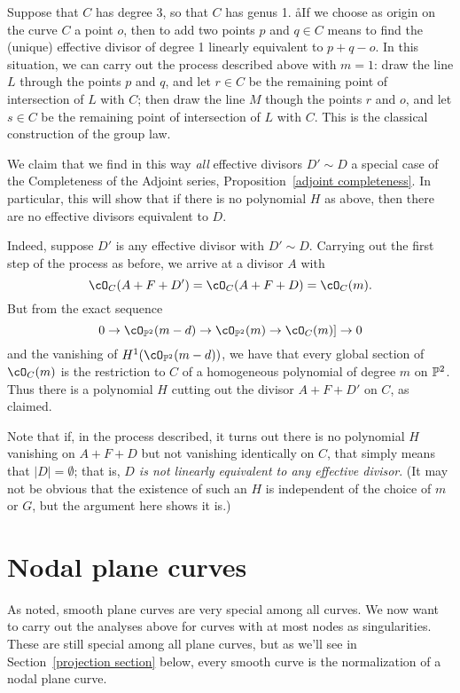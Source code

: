 \begin{example}
Suppose that $C$ has degree 3, so that $C$ has genus 1. åIf we choose as origin on the curve $C$ a point $o$, then to add two points $p$ and $q \in C$ means to find the (unique) effective divisor of degree 1 linearly equivalent to $p + q - o$. In this situation, we can carry out the process described above with $m=1$: draw the line $L$ through the points $p$ and $q$, and let $r \in C$ be the remaining point of intersection of $L$ with $C$; then draw the line $M$ though the points $r$ and $o$, and let $s \in C$ be the remaining point of intersection of $L$ with $C$. This is the classical construction of the group law.
\end{example}

We claim that we find in this way \emph{all} effective divisors $D' \sim D$ a special case of the Completeness of the Adjoint series, Proposition~\ref{adjoint completeness}. In particular, this will show that if there is no polynomial $H$ as above, then there are no effective divisors equivalent to $D$.

Indeed, suppose $D'$ is any effective divisor with $D' \sim D$. Carrying out the first step of the process as before, we arrive at a divisor $A$ with 
$$
\cO_C(A+F+D') = \cO_C(A+F+D)  = \cO_C(m).
$$
But from the exact sequence 
$$
0 \to \cO_{\PP^2}(m-d) \to \cO_{\PP^2}(m)  \to \cO_C(m) ]\to 0
$$
and the vanishing of $H^1(\cO_{\PP^2}(m-d))$, we have that every global section of $ \cO_C(m)$ is the restriction to $C$ of a homogeneous polynomial of degree $m$ on $\PP^2$. Thus there is a polynomial $H$ cutting out the divisor $A+F+D'$ on $C$, as claimed.

Note that if, in the process described, it turns out there is no polynomial $H$ vanishing on  $A + F + D$ but not vanishing identically on $C$, that simply means that $|D| = \emptyset$; that is, \emph{$D$ is not linearly equivalent to any effective divisor}. (It may not be obvious that the existence of such an $H$ is independent of the choice of $m$ or $G$, but the argument here shows it is.)

\section{Nodal plane curves}\label{nodal plane curves}

As noted, smooth plane curves are very special among all curves. We now want to carry out the analyses above for curves with at most nodes as singularities. These are still special among all plane curves, but as we'll see in Section~\ref{projection section} below, every smooth curve is the normalization of a nodal plane curve.


